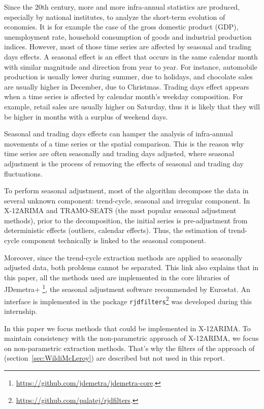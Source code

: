 \documentclass[
  12pt,
  ,
  a4paper]{article}
\newcommand\1{\mathds{1}}
\begin{document}
Since the 20th century, more and more infra-annual statistics are produced, especially by national institutes, to analyze the short-term evolution of economies.
It is for example the case of the gross domestic product (GDP), unemployment rate, household consumption of goods and industrial production indices.
However, most of those time series are affected by seasonal and trading days effects.
A seasonal effect is an effect that occurs in the same calendar month with similar magnitude and direction from year to year.
For instance, automobile production is usually lower during summer, due to holidays, and chocolate sales are usually higher in December, due to Christmas.
Trading days effect appears when a time series is affected by calendar month's weekday composition.
For example, retail sales are usually higher on Saturday, thus it is likely that they will be higher in months with a surplus of weekend days.

Seasonal and trading days effects can hamper the analysis of infra-annual movements of a time series or the spatial comparison.
This is the reason why time series are often seasonally and trading days adjusted, where seasonal adjustment is the process of removing the effects of seasonal and trading day fluctuations.

To perform seasonal adjustment, most of the algorithm decompose the data in several unknown component: trend-cycle, seasonal and irregular component.
In X-12ARIMA and TRAMO-SEATS (the most popular seasonal adjustment methods), prior to the decomposition, the initial series is pre-adjustment from deterministic effects (outliers, calendar effects).
Thus, the estimation of trend-cycle component technically is linked to the seasonal component.

Moreover, since the trend-cycle extraction methods are applied to seasonally adjusted data, both problems cannot be separated.
This link also explains that in this paper, all the methods used are implemented in the core libraries of JDemetra+ \footnote{\url{https://github.com/jdemetra/jdemetra-core}.}, the seasonal adjustment software recommended by Eurostat.
An  interface is implemented in the package \texttt{rjdfilters}\footnote{\url{https://github.com/palatej/rjdfilters}.} was developed during this internship.

In this paper we focus methods that could be implemented in X-12ARIMA.
To maintain consistency with the non-parametric approach of X-12ARIMA, we focus on non-parametric extraction methods.
That's why the filters of the approach of \textcite{trilemmaWMR2019} (section~\ref{sec:WildiMcLeroy}) are described but not used in this report.
\end{document}
